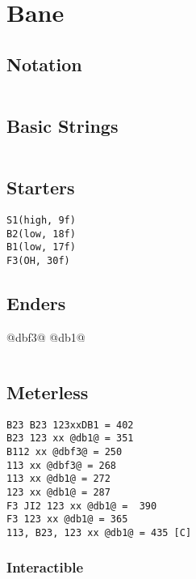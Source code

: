 \documentclass[main.tex]{subfiles}
\begin{document}
\chapter{Bane}

\section{Notation}
\begin{lstlisting}[language=FG]

\end{lstlisting}


\section{Basic Strings}

\begin{lstlisting}[language=FG]
\end{lstlisting}

\section{Starters}
\begin{lstlisting}[language=FG]
S1(high, 9f)
B2(low, 18f)
B1(low, 17f) 
F3(OH, 30f)
\end{lstlisting}

\section{Enders}
@dbf3@
@db1@
\begin{lstlisting}[language=FG]
\end{lstlisting}

\section{Meterless}


\begin{lstlisting}[language=FG]
B23 B23 123xxDB1 = 402 
B23 123 xx @db1@ = 351
B112 xx @dbf3@ = 250
113 xx @dbf3@ = 268
113 xx @db1@ = 272
123 xx @db1@ = 287 
F3 JI2 123 xx @db1@ =  390 
F3 123 xx @db1@ = 365 
113, B23, 123 xx @db1@ = 435 [C]
\end{lstlisting}

\subsection{Interactible}
\begin{lstlisting}[language=FG]

\end{lstlisting}
\end{document}
